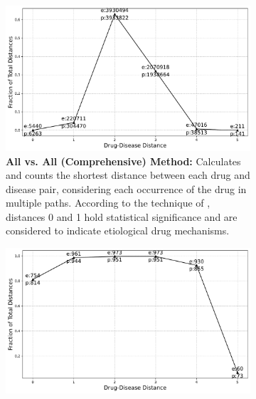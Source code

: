 \documentclass[journal,twoside,web]{ieeecolor}
\begin{document}

\begin{figure}[H]
\centering
\begin{subfigure}[H]{\linewidth}
   \includegraphics[width=\linewidth]{Figures/Yildrim_all_shortest_distance.pdf}
   \caption{\textbf{All vs. All (Comprehensive) Method:} Calculates and counts the shortest distance between each drug and disease pair, considering each occurrence of the drug in multiple paths.
   According to the technique of \cite{yildirim2007drug}, distances 0 and 1 hold statistical significance and are considered to indicate etiological drug mechanisms.}
   \label{fig:yildirim1}
\end{subfigure}
\begin{subfigure}[H]{\linewidth}
   \includegraphics[width=\linewidth]{Figures/Yildrim_ALL_unique_drug_count_shortest_distance.pdf}

\end{subfigure}
\end{figure}
\end{document}
